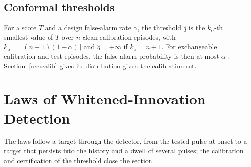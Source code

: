 \documentclass[journal]{IEEEtran}
\begin{document}
\subsection{Conformal thresholds}
For a score $T$ and a design false-alarm rate $\alpha$, the threshold $\widehat q$ is the $k_\alpha$-th smallest value of $T$ over $n$ clean calibration episodes, with $k_\alpha=\lceil(n+1)(1-\alpha)\rceil$ and $\widehat q=+\infty$ if $k_\alpha=n+1$. For exchangeable calibration and test episodes, the false-alarm probability is then at most $\alpha$ \cite{lei2018,bates2023}. Section~\ref{sec:calib} gives its distribution given the calibration set.

\section{Laws of Whitened-Innovation Detection}\label{sec:laws}
The laws follow a target through the detector, from the tested pulse at onset to a target that persists into the history and a dwell of several pulses; the calibration and certification of the threshold close the section.
\end{document}
